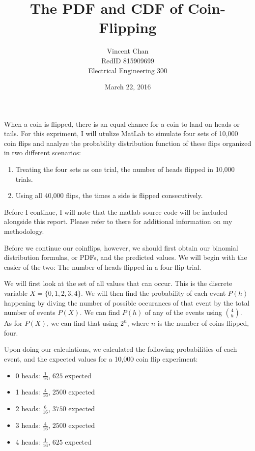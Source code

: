 \documentclass{report}
\begin{document}
\title{The PDF and CDF of Coin-Flipping}
\author{Vincent Chan
		 \\RedID 815909699
		  \\Electrical Engineering 300}
\date{March 22, 2016}
\maketitle
\lstset{language=MatLab}

When a coin is flipped, there is an equal chance for a coin to land on heads or tails. For this expriment, I will utulize MatLab to simulate four sets of 10,000 coin flips and analyze the probability distribution function of these flips organized in two different scenarios:

\begin{enumerate}
\item{Treating the four sets as one trial, the number of heads flipped in 10,000 trials.}
\item{Using all 40,000 flips, the times a side is flipped consecutively.}
\end{enumerate}

Before I continue, I will note that the matlab source code will be included alongside this report. Please refer to there for additional information on my methodology.

Before we continue our coinflips, however, we should first obtain our binomial distribution formulas, or PDFs, and the predicted values. We will begin with the easier of the two: The number of heads flipped in a four flip trial.

We will first look at the set of all values that can occur. This is the discrete variable $X = \{0, 1, 2, 3, 4\}$. We will then find the probability of each event $P(h)$ happening by diving the number of possible occurances of that event by the total number of events $P(X)$. We can find $P(h)$ of any of the events using $4\choose h$. As for $P(X)$, we can find that using $2^n$, where $n$ is the number of coins flipped, four. 

Upon doing our calculations, we calculated the following probabilities of each event, and the expected values for a 10,000 coin flip experiment:

\begin{itemize}
\item{0 heads: $\frac{1}{16}$, $625$ expected}
\item{1 heads: $\frac{4}{16}$, $2500$ expected}
\item{2 heads: $\frac{6}{16}$, $3750$ expected}
\item{3 heads: $\frac{4}{16}$, $2500$ expected}
\item{4 heads: $\frac{1}{16}$, $625$ expected}
\end{itemize}
\end{document}
